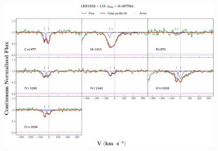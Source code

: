 \documentclass[12pt]{report}
\begin{document}
\begin{landscape}

\begin{figure}
    \centering
    \vspace{-20mm}
    \hspace*{-35mm}
    \includegraphics[width=1.25\linewidth]{System-Plots/1ES1553+113_z=0.187764_sys_plot.png}
\end{figure}

\end{landscape}
\end{document}
